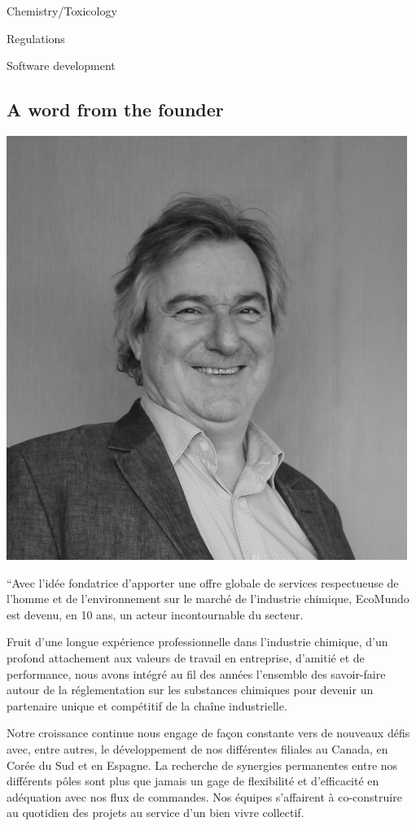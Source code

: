 \documentclass[a4paper,12pt,twoside]{report}
\begin{document}
\itemize[label=$\bullet$] 
\item Chemistry/Toxicology
\item Regulations
\item Software development
\subsection{A word from the founder}
\includegraphics[scale=0.5]{images/pierre}

“Avec l’idée fondatrice d’apporter une offre globale de services respectueuse de l’homme et de l’environnement sur le marché de l’industrie chimique, EcoMundo est devenu, en 10 ans, un acteur incontournable du secteur. 

Fruit d’une longue expérience professionnelle dans l’industrie chimique, d’un profond attachement aux valeurs de travail en entreprise, d’amitié et de performance, nous avons intégré au fil des années l’ensemble des savoir-faire autour de la réglementation sur les substances chimiques pour devenir un partenaire unique et compétitif de la chaîne industrielle.

Notre croissance continue nous engage de façon constante vers de nouveaux défis avec, entre autres, le développement de nos différentes filiales au Canada, en Corée du Sud et en Espagne. La recherche de synergies permanentes entre nos différents pôles sont plus que jamais un gage de flexibilité et d’efficacité en adéquation avec nos flux de commandes. Nos équipes s’affairent à co-construire au quotidien des projets au service d’un bien vivre collectif.
\end{document}
